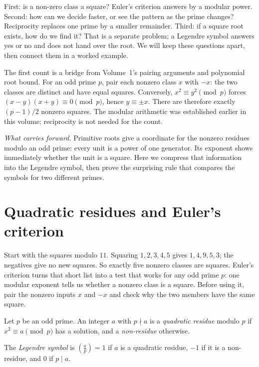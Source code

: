 \begin{reminder}
First: is a non-zero class a square? Euler's criterion answers by a modular
power. Second: how can we decide faster, or see the pattern as the prime
changes? Reciprocity replaces one prime by a smaller remainder. Third: if a
square root exists, how do we find it? That is a separate problem; a Legendre
symbol answers yes or no and does not hand over the root. We will keep these
questions apart, then connect them in a worked example.

The first count is a bridge from Volume~1's pairing arguments and
polynomial root bound. For an odd prime $p$, pair each nonzero class $x$
with $-x$: the two classes are distinct and have equal squares.
Conversely, $x^2\equiv y^2\pmod p$ forces
$(x-y)(x+y)\equiv0\pmod p$, hence $y\equiv\pm x$.
There are therefore exactly $(p-1)/2$ nonzero squares.
The modular arithmetic was established earlier in this volume;
reciprocity is not needed for the count.
\end{reminder}

\noindent\emph{What carries forward.} Primitive roots give a coordinate for the nonzero residues modulo an odd prime: every unit is a power of one generator. Its exponent shows immediately whether the unit is a square. Here we compress that information into the Legendre symbol, then prove the surprising rule that compares the symbols for two different primes.

\section{Quadratic residues and Euler's criterion}

Start with the squares modulo $11$. Squaring $1,2,3,4,5$ gives $1,4,9,5,3$; the negatives give no new squares. So exactly five nonzero classes are squares. Euler's criterion turns that short list into a test that works for any odd prime $p$: one modular exponent tells us whether a nonzero class is a square. Before using it, pair the nonzero inputs $x$ and $-x$ and check why the two members have the same square.

Let $p$ be an odd prime. An integer $a$ with $p\nmid a$ is a \emph{quadratic residue} modulo $p$ if $x^2\equiv a\pmod p$ has a solution, and a \emph{non-residue} otherwise.

\begin{definition}\label{def:legendre}
The \emph{Legendre symbol} is $\left(\frac ap\right)=1$ if $a$ is a quadratic residue, $-1$ if it is a non-residue, and $0$ if $p\mid a$.
\end{definition}

